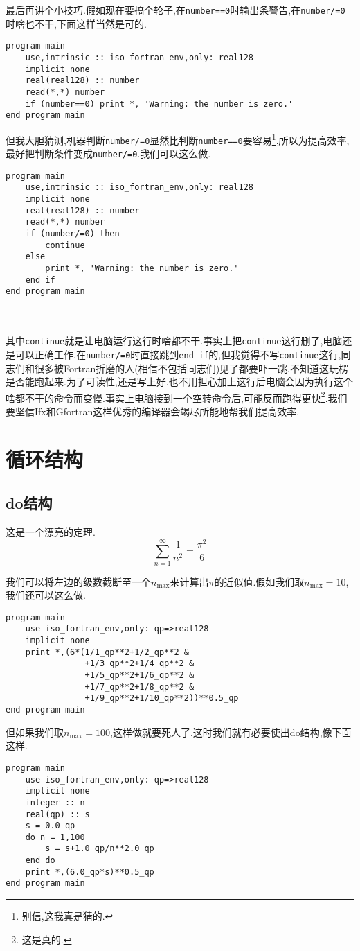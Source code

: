 最后再讲个小技巧.假如现在要搞个轮子,在\texttt{number==0}时输出条警告,在\texttt{number/=0}时啥也不干,下面这样当然是可的.
\begin{lstlisting}
program main
    use,intrinsic :: iso_fortran_env,only: real128
    implicit none
    real(real128) :: number
    read(*,*) number
    if (number==0) print *, 'Warning: the number is zero.'
end program main
\end{lstlisting}
但我大胆猜测,机器判断\texttt{number/=0}显然比判断\texttt{number==0}要容易\footnote{
    别信,这我真是猜的.
},所以为提高效率,最好把判断条件变成\texttt{number/=0}.我们可以这么做.\label{use_continue}
\begin{lstlisting}
program main
    use,intrinsic :: iso_fortran_env,only: real128
    implicit none
    real(real128) :: number
    read(*,*) number
    if (number/=0) then
        continue
    else
        print *, 'Warning: the number is zero.'
    end if
end program main
\end{lstlisting}
\mbox{}\\\mbox{}\\
其中\texttt{continue}就是让电脑运行这行时啥都不干.事实上把\texttt{continue}这行删了,电脑还是可以正确工作,在\texttt{number/=0}时直接跳到\texttt{end if}的,但我觉得不写\texttt{continue}这行,同志们和很多被Fortran折磨的人(相信不包括同志们)见了都要吓一跳,不知道这玩楞是否能跑起来.为了可读性,还是写上好.也不用担心加上这行后电脑会因为执行这个啥都不干的命令而变慢.事实上电脑接到一个空转命令后,可能反而跑得更快\footnote{
    这是真的.
}.我们要坚信Ifx和Gfortran这样优秀的编译器会竭尽所能地帮我们提高效率.

\section{循环结构}

\subsection{do结构}\label{do_construct}

这是一个漂亮的定理.
\begin{equation*}
    \sum_{n=1}^{\infty} \frac{1}{n^2} = \frac{\pi^2}{6}
\end{equation*}

我们可以将左边的级数截断至一个$n_{\text{max}}$来计算出$\pi$的近似值.假如我们取$n_{\text{max}}=10$,我们还可以这么做.
\begin{lstlisting}
program main
    use iso_fortran_env,only: qp=>real128
    implicit none
    print *,(6*(1/1_qp**2+1/2_qp**2 &
                +1/3_qp**2+1/4_qp**2 &
                +1/5_qp**2+1/6_qp**2 &
                +1/7_qp**2+1/8_qp**2 &
                +1/9_qp**2+1/10_qp**2))**0.5_qp
end program main
\end{lstlisting}
但如果我们取$n_{\text{max}}=100$,这样做就要死人了.这时我们就有必要使出do结构,像下面这样.\newpage
\begin{lstlisting}
program main
    use iso_fortran_env,only: qp=>real128
    implicit none
    integer :: n
    real(qp) :: s
    s = 0.0_qp
    do n = 1,100
        s = s+1.0_qp/n**2.0_qp
    end do
    print *,(6.0_qp*s)**0.5_qp
end program main
\end{lstlisting}

